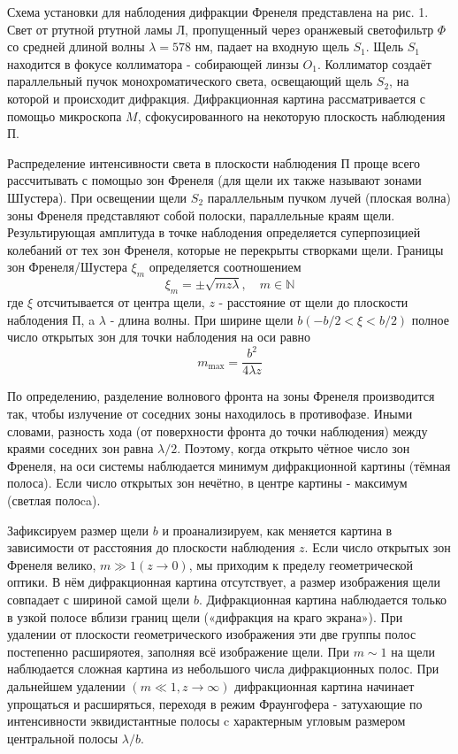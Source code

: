 \documentclass[a4paper, 12pt]{article}
\begin{document}
Схема установки для наблодения дифракции Френеля представлена на рис. 1. Свет от ртутной ртутной ламы Л, пропущенный через оранжевый светофильтр $\Phi$ со средней длиной волны $\lambda=578$ нм, падает на входную щель $S_1$. Щель $S_1$ находится в фокусе коллиматора - собирающей линзы $O_1$. Коллиматор создаёт параллельный пучок монохроматического света, освещающий щель $S_2$, на которой и происходит дифракция. Дифракционная картина рассматривается с помощьо микроскопа $M$, сфокусированного на некоторую плоскость наблюдения П.

Распределение интенсивности света в плоскости наблюдения П проще всего рассчитывать с помощыо зон Френеля (для щели их также называют зонами ШIустера). При освещении щели $S_2$ параллельным пучком лучей (плоская волна) зоны Френеля представляют собой полоски, параллельные краям щели. Результирующая амплитуда в точке наблодения определяется суперпозицией колебаний от тех зон Френеля, которые не перекрыты створками щели. Границы зон Френеля/Шустера $\xi_m$ определяется соотношением
$$
\xi_m= \pm \sqrt{m z \lambda}, \quad m \in \mathbb{N}
$$
где $\xi$ отсчитывается от центра щели, $z$ - расстояние от щели до плоскости наблодения П, a $\lambda$ - длина волны. При ширине щели $b(-b / 2<\xi<b / 2)$ полное число открытых зон для точки наблодения на оси равно
$$
m_{\max }=\frac{b^2}{4 \lambda z}
$$

По определению, разделение волнового фронта на зоны Френеля производится так, чтобы излучение от соседних зоны находилось в противофазе. Иными словами, разность хода (от поверхности фронта до точки наблюдения) между краями соседних зон равна $\lambda / 2$. Поэтому, когда открыто чётное число зон Френеля, на оси системы наблюдается минимум дифракционной картины (тёмная полоса). Если число открытых зон нечётно, в центре картины - максимум (светлая полоca).

Зафиксируем размер щели $b$ и проанализируем, как меняется картина в зависимости от расстояния до плоскости наблюдения $z$. Если число открытых зон Френеля велико, $m \gg 1(z \rightarrow 0)$, мы приходим к пределу геометрической оптики. В нём дифракционная картина отсутствует, а размер изображения щели совпадает с шириной самой щели $b$. Дифракционная картина наблюдается только в узкой полосе вблизи границ щели («дифракция на краго экрана»). При удалении от плоскости геометрического изображения эти две группы полос постепенно расширяотея, заполняя всё изображение щели. При $m \sim 1$ на щели наблюдается сложная картина из небольшого числа дифракционных полос. При дальнейшем удалении $(m \ll 1, z \rightarrow \infty)$ дифракционная картина начинает упрощаться и расширяться, переходя в режим Фраунгофера - затухающие по интенсивности эквидистантные полосы c характерным угловым размером центральной полосы $\lambda / b$.
\end{document}
